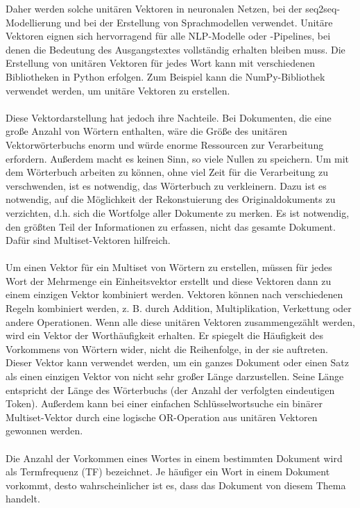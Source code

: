 Daher werden solche unitären Vektoren in neuronalen Netzen, bei der \ac{seq2seq}-Modellierung und bei der Erstellung von Sprachmodellen verwendet. 
Unitäre Vektoren eignen sich hervorragend für alle \ac{NLP}-Modelle oder -Pipelines, bei denen die Bedeutung des Ausgangstextes vollständig erhalten bleiben muss.
Die Erstellung von unitären Vektoren für jedes Wort kann mit verschiedenen Bibliotheken in Python erfolgen. 
Zum Beispiel kann die NumPy-Bibliothek verwendet werden, um unitäre Vektoren zu erstellen.\\\\
Diese Vektordarstellung hat jedoch ihre Nachteile. 
Bei Dokumenten, die eine große Anzahl von Wörtern enthalten, wäre die Größe des unitären Vektorwörterbuchs enorm und würde enorme Ressourcen zur Verarbeitung erfordern. 
Außerdem macht es keinen Sinn, so viele Nullen zu speichern. 
Um mit dem Wörterbuch arbeiten zu können, ohne viel Zeit für die Verarbeitung zu verschwenden, ist es notwendig, das Wörterbuch zu verkleinern. 
Dazu ist es notwendig, auf die Möglichkeit der Rekonstuierung des Originaldokuments zu verzichten, d.h. sich die Wortfolge aller Dokumente zu merken. 
Es ist notwendig, den größten Teil der Informationen zu erfassen, nicht das gesamte Dokument. Dafür sind Multiset-Vektoren hilfreich.\\\\
Um einen Vektor für ein Multiset von Wörtern zu erstellen, müssen für jedes Wort der Mehrmenge ein Einheitsvektor erstellt und diese Vektoren dann zu einem einzigen Vektor kombiniert werden. 
Vektoren können nach verschiedenen Regeln kombiniert werden, z. B. durch Addition, Multiplikation, Verkettung oder andere Operationen. 
Wenn alle diese unitären Vektoren zusammengezählt werden, wird ein Vektor der Worthäufigkeit erhalten. 
Er spiegelt die Häufigkeit des Vorkommens von Wörtern wider, nicht die Reihenfolge, in der sie auftreten. 
Dieser Vektor kann verwendet werden, um ein ganzes Dokument oder einen Satz als einen einzigen Vektor von nicht sehr großer Länge darzustellen. 
Seine Länge entspricht der Länge des Wörterbuchs (der Anzahl der verfolgten eindeutigen Token). 
Außerdem kann bei einer einfachen Schlüsselwortsuche ein binärer Multiset-Vektor durch eine logische OR-Operation aus unitären Vektoren gewonnen werden.\\\\
Die Anzahl der Vorkommen eines Wortes in einem bestimmten Dokument wird als Termfrequenz (\ac{TF}) bezeichnet. 
Je häufiger ein Wort in einem Dokument vorkommt, desto wahrscheinlicher ist es, dass das Dokument von diesem Thema handelt. 
